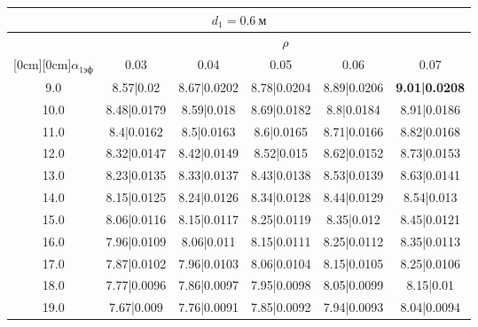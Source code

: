 \documentclass[20pt]{article}
\begin{document}
\begin{center}
\begin{tabular}{c|ccccc}
\hline
	\multicolumn{6}{c}{$d_{1}=0.6 \ м$} \\
\hline
	 & \multicolumn{5}{|c}{$\rho$} \\
	\cline{2-6}
	\raisebox{1.5ex}[0cm][0cm]{$\alpha_{1эф}$} & 0.03 & 0.04 & 0.05 & 0.06 & 0.07\\
\hline
	9.0 & 	8.57|0.02 & 	8.67|0.0202 & 	8.78|0.0204 & 	8.89|0.0206 & 	\textbf{9.01|0.0208}\\
	10.0 & 	8.48|0.0179 & 	8.59|0.018 & 	8.69|0.0182 & 	8.8|0.0184 & 	8.91|0.0186\\
	11.0 & 	8.4|0.0162 & 	8.5|0.0163 & 	8.6|0.0165 & 	8.71|0.0166 & 	8.82|0.0168\\
	12.0 & 	8.32|0.0147 & 	8.42|0.0149 & 	8.52|0.015 & 	8.62|0.0152 & 	8.73|0.0153\\
	13.0 & 	8.23|0.0135 & 	8.33|0.0137 & 	8.43|0.0138 & 	8.53|0.0139 & 	8.63|0.0141\\
	14.0 & 	8.15|0.0125 & 	8.24|0.0126 & 	8.34|0.0128 & 	8.44|0.0129 & 	8.54|0.013\\
	15.0 & 	8.06|0.0116 & 	8.15|0.0117 & 	8.25|0.0119 & 	8.35|0.012 & 	8.45|0.0121\\
	16.0 & 	7.96|0.0109 & 	8.06|0.011 & 	8.15|0.0111 & 	8.25|0.0112 & 	8.35|0.0113\\
	17.0 & 	7.87|0.0102 & 	7.96|0.0103 & 	8.06|0.0104 & 	8.15|0.0105 & 	8.25|0.0106\\
	18.0 & 	7.77|0.0096 & 	7.86|0.0097 & 	7.95|0.0098 & 	8.05|0.0099 & 	8.15|0.01\\
	19.0 & 	7.67|0.009 & 	7.76|0.0091 & 	7.85|0.0092 & 	7.94|0.0093 & 	8.04|0.0094\\
\end{tabular}


\end{center}
\end{document}
